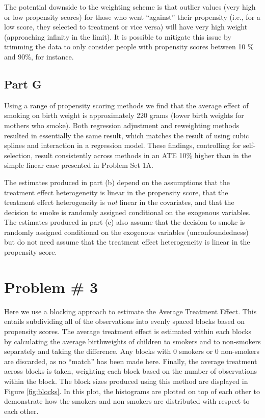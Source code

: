 \documentclass[letterpaper, 12pt]{article}
\begin{document}
The potential downside to the weighting scheme is that outlier values (very high or low propensity scores) for those who went ``against'' their propensity (i.e., for a low score, they selected to treatment or vice versa) will have very high weight (approaching infinity in the limit).  It is possible to mitigate this issue by trimming the data to only consider people with propensity scores between 10 \% and 90\%, for instance.  

\subsection{Part G}
Using a range of propensity scoring methods we find that the average effect of smoking on birth weight is approximately 220 grams (lower birth weights for mothers who smoke).  Both regression adjustment and reweighting methods resulted in essentially the same result, which matches the result of using cubic splines and interaction in a regression model. These findings, controlling for self-selection, result consistently across methods in an ATE 10\% higher than in the simple linear case presented in Problem Set 1A.

The estimates produced in part (b) depend on the assumptions that the treatment effect heterogeneity is linear in the propensity score, that the treatment effect heterogeneity is \emph{not} linear in the covariates, and that the decision to smoke is randomly assigned conditional on the exogenous variables.
The estimates produced in part (c) also assume that the decision to smoke is randomly assigned conditional on the exogenous variables (unconfoundedness) but do not need assume that the treatment effect heterogeneity is linear in the propensity score.  

\section{Problem \# 3}
Here we use a blocking approach to estimate the Average Treatment Effect. This entails subdividing all of the observations into evenly spaced blocks based on propensity scores. The average treatment effect is estimated within each blocks by calculating the average birthweights of children to smokers and to non-smokers separately and taking the difference. Any blocks with 0 smokers or 0 non-smokers are discarded, as no ``match'' has been made here. Finally, the average treatment across blocks is taken, weighting each block based on the number of observations within the block. 
The block sizes produced using this method are displayed in Figure \ref{fig:blocks}. In this plot, the histograms are plotted on top of each other to demonstrate how the smokers and non-smokers are distributed with respect to each other.
\end{document}
